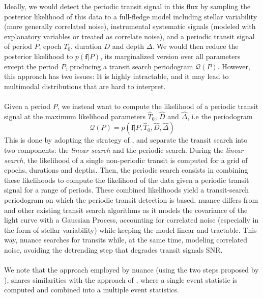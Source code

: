 \documentclass{aastex631}
\begin{document}
Ideally, we would detect the periodic transit signal in this flux by sampling the posterior likelihood of this data to a full-fledge model including stellar variability (more generally correlated noise), instrumental systematic signals (modeled with explanatory variables or treated as correlate noise), and a periodic transit signal of period $P$, epoch $T_0$, duration $D$ and depth $\Delta$. We would then reduce the posterior likelihood to $p(\bm{f}\vert P)$, its marginalized version over all parameters except the period $P$, producing a transit search periodogram $\mathcal{Q}(P)$. However, this approach has two issues: It is highly intractable, and it may lead to multimodal distributions that are hard to interpret.
\\\\
Given a period $P$, we instead want to compute the likelihood of a periodic transit signal at the maximum likelihood parameters $\hat T_0$, $\hat D$ and $\hat \Delta$, i.e the periodogram
\begin{equation}\label{eq:periodogram}
        \mathcal{Q}(P) = p(\bm{f} \vert P, \hat T_0 ,\hat D, \hat \Delta)
\end{equation}
This is done by adopting the strategy of \cite{foreman2016}, and separate the transit search into two components: the \textit{linear search} and the periodic search. During the \textit{linear search}, the likelihood of a single non-periodic transit is computed for a grid of epochs, durations and depths. Then, the periodic search consists in combining these likelihoods to compute the likelihood of the data given a periodic transit signal for a range of periods. These combined likelihoods yield a transit-search periodogram on which the periodic transit detection is based. \textsf{nuance} differs from \cite{foreman2016} and other existing transit search algorithms as it models the covariance of the light curve with a Gaussian Process, accounting for correlated noise (especially in the form of stellar variability) while keeping the model linear and tractable. This way, \textsf{nuance} searches for transits while, at the same time, modeling correlated noise, avoiding the detrending step that degrades transit signals SNR.\\\\
We note that the approach employed by \textsf{nuance} (using the two steps proposed by \citealt{foreman2016}), shares similarities with the approach of \cite{Jenkins2010}, where a single event statistic is computed and combined into a multiple event statistics.
\end{document}
